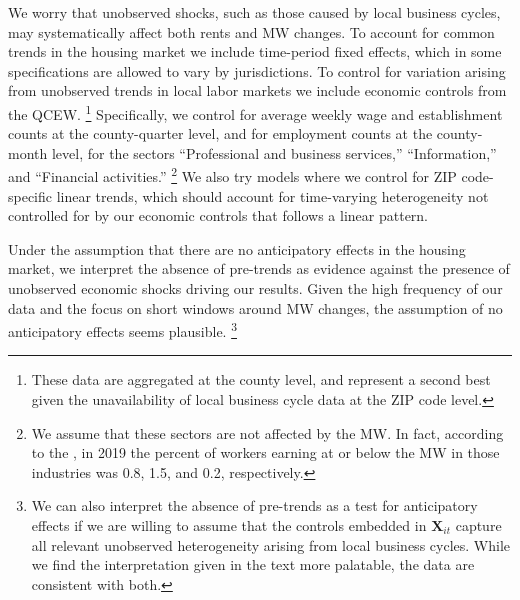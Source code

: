 We worry that unobserved shocks, such as those caused by local business cycles, 
may systematically affect both rents and MW changes.
To account for common trends in the housing market we include time-period 
fixed effects, which in some specifications are allowed to vary by jurisdictions.
To control for variation arising from unobserved trends in local labor markets 
we include economic controls from the QCEW.%
\footnote{These data are aggregated at the county level, and represent a second 
best given the unavailability of local business cycle data at the ZIP code 
level.}
Specifically, we control for average weekly wage and establishment counts at the 
county-quarter level, and for employment counts at the county-month level, 
for the sectors ``Professional and business services,'' ``Information,'' and 
``Financial activities.''%
\footnote{We assume that these sectors are not affected by the MW.
In fact, according to the \textcite[][Table 5]{MinWorkersReportBLS}, in 
2019 the percent of workers earning at or below the MW in those 
industries was 0.8, 1.5, and 0.2, respectively.}
We also try models where we control for ZIP code-specific linear
trends, which should account for time-varying heterogeneity not controlled for 
by our economic controls that follows a linear pattern.

Under the assumption that there are no anticipatory effects in the housing 
market, we interpret the absence of pre-trends as evidence against the presence 
of unobserved economic shocks driving our results.
Given the high frequency of our data and the focus on short windows around 
MW changes, the assumption of no anticipatory effects seems plausible.%
\footnote{We can also interpret the absence of pre-trends as a test for 
anticipatory effects if we are willing to assume that the controls embedded in 
$\mathbf{X}_{it}$ capture all relevant unobserved heterogeneity arising from 
local business cycles.
While we find the interpretation given in the text more palatable, the data are 
consistent with both.}


